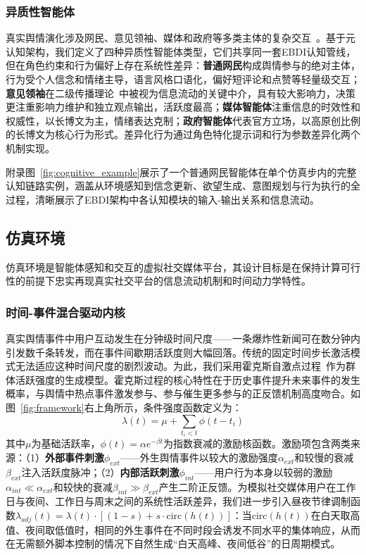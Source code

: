 \documentclass[lettersize,journal]{IEEEtran}
\begin{document}
\subsubsection{异质性智能体}

真实舆情演化涉及网民、意见领袖、媒体和政府等多类主体的复杂交互~\cite{chen_evolution_2025,wu_public_2023}。基于元认知架构，我们定义了四种异质性智能体类型，它们共享同一套EBDI认知管线，但在角色约束和行为偏好上存在系统性差异：\textbf{普通网民}构成舆情参与的绝对主体，行为受个人信念和情绪主导，语言风格口语化，偏好短评论和点赞等轻量级交互；\textbf{意见领袖}在二级传播理论~\cite{katz_personal_1955}中被视为信息流动的关键中介，具有较大影响力，决策更注重影响力维护和独立观点输出，活跃度最高；\textbf{媒体智能体}注重信息的时效性和权威性，以长博文为主，情绪表达克制；\textbf{政府智能体}代表官方立场，以高原创比例的长博文为核心行为形式。差异化行为通过角色特化提示词和行为参数差异化两个机制实现。

附录图~\ref{fig:cognitive_example}展示了一个普通网民智能体在单个仿真步内的完整认知链路实例，涵盖从环境感知到信念更新、欲望生成、意图规划与行为执行的全过程，清晰展示了EBDI架构中各认知模块的输入-输出关系和信息流动。

\subsection{仿真环境}
\label{subsec:env}

仿真环境是智能体感知和交互的虚拟社交媒体平台，其设计目标是在保持计算可行性的前提下忠实再现真实社交平台的信息流动机制和时间动力学特性。

\subsubsection{时间-事件混合驱动内核}

真实舆情事件中用户互动发生在分钟级时间尺度——一条爆炸性新闻可在数分钟内引发数千条转发，而在事件间歇期活跃度则大幅回落。传统的固定时间步长激活模式无法适应这种时间尺度的剧烈波动。为此，我们采用霍克斯自激点过程~\cite{hawkes_spectra_1971}作为群体活跃强度的生成模型。霍克斯过程的核心特性在于历史事件提升未来事件的发生概率，与舆情中热点事件激发参与、参与催生更多参与的正反馈机制高度吻合。如图~\ref{fig:framework}右上角所示，条件强度函数定义为：
\begin{equation}
\lambda(t) = \mu + \sum_{t_i < t} \phi(t - t_i)
\label{eq:hawkes}
\end{equation}
其中$\mu$为基础活跃率，$\phi(t) = \alpha e^{-\beta t}$为指数衰减的激励核函数。激励项包含两类来源：（1）\textbf{外部事件刺激}$\phi_{ext}$——外生舆情事件以较大的激励强度$\alpha_{ext}$和较慢的衰减$\beta_{ext}$注入活跃度脉冲；（2）\textbf{内部活跃刺激}$\phi_{int}$——用户行为本身以较弱的激励$\alpha_{int} \ll \alpha_{ext}$和较快的衰减$\beta_{int} \gg \beta_{ext}$产生二阶正反馈。为模拟社交媒体用户在工作日与夜间、工作日与周末之间的系统性活跃差异，我们进一步引入昼夜节律调制函数$\lambda_{adj}(t) = \lambda(t) \cdot [(1 - s) + s \cdot \text{circ}(h(t))]$：当$\text{circ}(h(t))$在白天取高值、夜间取低值时，相同的外生事件在不同时段会诱发不同水平的集体响应，从而在无需额外脚本控制的情况下自然生成“白天高峰、夜间低谷”的日周期模式。
\end{document}
